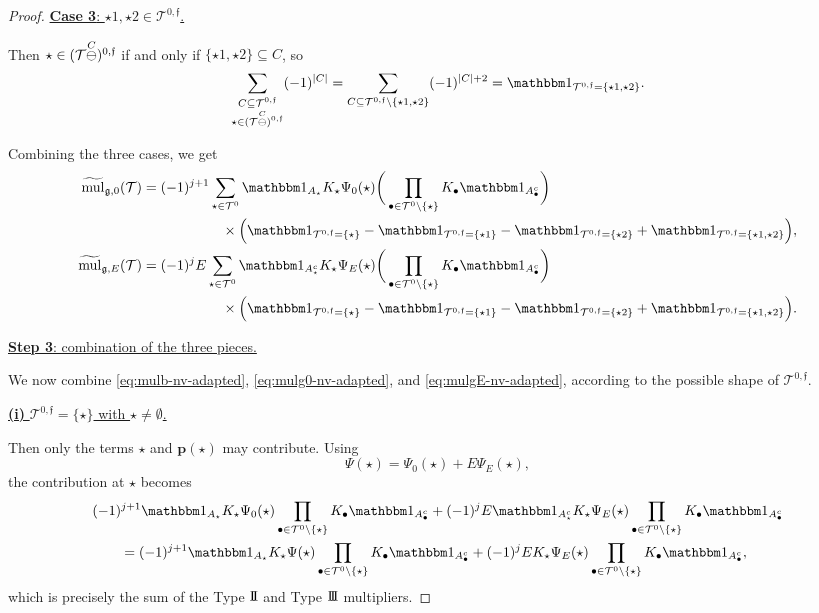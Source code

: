 \documentclass[a4paper,
11pt,  reqno]{amsart}
\makeatletter
\newcommand{\II}{\textup{I \hspace{-2.9mm} I} }
\newcommand{\III}{\textup{I \hspace{-2.9mm} I \hspace{-2.9mm} I}}
\newcommand{\5}{\textup{V}}
\newcommand{\noi}{\noindent}
\newcommand{\ind}{\mathbbm 1}
\newcommand{\wt}{\widetilde}
\theoremstyle{remark}
\newcommand{\bul}{\bullet}
\newcommand{\TT}{\mathcal{T}}
\newcommand{\gfrak}{\mathfrak{g}}
\newcommand{\pb}{\mathbf{p}}
\newcommand{\ff}{\mathfrak{f}}
\DeclareMathOperator{\mul}{mul}
\def\<#1>{\csname MH@symb@#1\endcsname}
\numberwithin{equation}{section}
\numberwithin{theorem}{section}
\makeatother
\begin{document}
\begin{proof}
\smallskip

\noi
\underline{\textbf{Case 3}: $\star1,\star2\in \TT^{0,\ff}$.}

Then $\star\in (\TT\overset{C}{\ominus}\<1>)^{0,\ff}$ if and only if $\{\star1,\star2\}\subseteq C$, so
\[
\sum_{\substack{C\subseteq \TT^{0,\ff}\\ \star\in (\TT\overset{C}{\ominus}\<1>)^{0,\ff}}}
(-1)^{|C|}
=
\sum_{C\subseteq \TT^{0,\ff}\setminus\{\star1,\star2\}}(-1)^{|C|+2}
=
\ind_{\TT^{0,\ff}=\{\star1,\star2\}}.
\]

Combining the three cases, we get
\begin{align}
\label{eq:mulg0-nv-adapted}
\wt{\mul}_{\gfrak,0}(\TT)
&=
(-1)^{j+1}
\sum_{\star\in \TT^0}
\ind_{A_\star}K_\star\Psi_0(\star)
\bigg(\prod_{\bul\in \TT^0\setminus\{\star\}}K_\bul\ind_{A_\bul^c}\bigg)
\nonumber\\
&\hspace{2cm}\times
\Big(
\ind_{\TT^{0,\ff}=\{\star\}}
-\ind_{\TT^{0,\ff}=\{\star1\}}
-\ind_{\TT^{0,\ff}=\{\star2\}}
+\ind_{\TT^{0,\ff}=\{\star1,\star2\}}
\Big),
\\
\label{eq:mulgE-nv-adapted}
\wt{\mul}_{\gfrak,E}(\TT)
&=
(-1)^j E
\sum_{\star\in \TT^0}
\ind_{A_\star^c}K_\star\Psi_E(\star)
\bigg(\prod_{\bul\in \TT^0\setminus\{\star\}}K_\bul\ind_{A_\bul^c}\bigg)
\nonumber\\
&\hspace{2cm}\times
\Big(
\ind_{\TT^{0,\ff}=\{\star\}}
-\ind_{\TT^{0,\ff}=\{\star1\}}
-\ind_{\TT^{0,\ff}=\{\star2\}}
+\ind_{\TT^{0,\ff}=\{\star1,\star2\}}
\Big).
\end{align}

\smallskip

\noi
\underline{\textbf{Step 3}: combination of the three pieces.}

We now combine \eqref{eq:mulb-nv-adapted}, \eqref{eq:mulg0-nv-adapted}, and \eqref{eq:mulgE-nv-adapted}, according to the possible shape of $\TT^{0,\ff}$.

\smallskip

\noi
\underline{\textbf{(i)} $\TT^{0,\ff}=\{\star\}$ with $\star\neq \emptyset$.}

Then only the terms $\star$ and $\pb(\star)$ may contribute. Using
\[
\Psi(\star)=\Psi_0(\star)+E\Psi_E(\star),
\]
the contribution at $\star$ becomes
\begin{align*}
&(-1)^{j+1}\ind_{A_\star}K_\star\Psi_0(\star)
\prod_{\bul\in \TT^0\setminus\{\star\}}K_\bul\ind_{A_\bul^c}
+
(-1)^jE\ind_{A_\star^c}K_\star\Psi_E(\star)
\prod_{\bul\in \TT^0\setminus\{\star\}}K_\bul\ind_{A_\bul^c}
\\
&\qquad =
(-1)^{j+1}\ind_{A_\star}K_\star\Psi(\star)
\prod_{\bul\in \TT^0\setminus\{\star\}}K_\bul\ind_{A_\bul^c}
+
(-1)^jE K_\star\Psi_E(\star)
\prod_{\bul\in \TT^0\setminus\{\star\}}K_\bul\ind_{A_\bul^c},
\end{align*}
which is precisely the sum of the Type $\II$ and Type $\III$ multipliers.


\end{proof}
\end{document}
